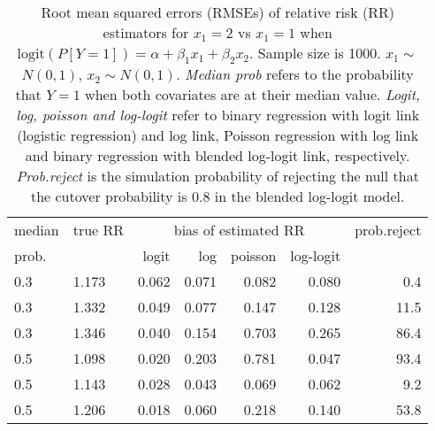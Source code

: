 \documentclass[12pt,a4paper]{article}
\begin{document}
\begin{table}[H] 
\small\sf\centering 
\caption{Root mean squared errors (RMSEs) of relative risk (RR) estimators for $x_1=2$ vs $x_1=1$ when $\mbox{logit}(P[Y=1])=\alpha+\beta_1 x_1 + \beta_2 x_2$. Sample size is 1000. $x_1 \sim $$N(0,1)$, $x_2 \sim N(0,1)$. {\it Median prob} refers to the probability that $Y=1$ when both covariates are at their median value. {\it Logit, log, poisson and log-logit} refer to binary regression with logit link (logistic regression) and log link, Poisson regression with log link and binary regression with blended log-logit link, respectively. {\it Prob.reject} is the simulation probability of rejecting the null that the cutover probability is $0.8$ in the blended log-logit model.} 
\begin{tabular}{llrrrrr} 
\toprule 
median & true RR & \multicolumn{4}{c}{bias of estimated RR} & prob.reject \\ 
prob. & & logit & log & poisson & log-logit  & \\ \midrule 
0.3 & 1.173 & 0.062 & 0.071 & 0.082 & 0.080 &  0.4 \\  
0.3 & 1.332 & 0.049 & 0.077 & 0.147 & 0.128 & 11.5 \\  
0.3 & 1.346 & 0.040 & 0.154 & 0.703 & 0.265 & 86.4 \\  
0.5 & 1.098 & 0.020 & 0.203 & 0.781 & 0.047 & 93.4 \\  
0.5 & 1.143 & 0.028 & 0.043 & 0.069 & 0.062 &  9.2 \\  
0.5 & 1.206 & 0.018 & 0.060 & 0.218 & 0.140 & 53.8 \\  
\bottomrule 
\end{tabular} 
\end{table} 
\end{document}
